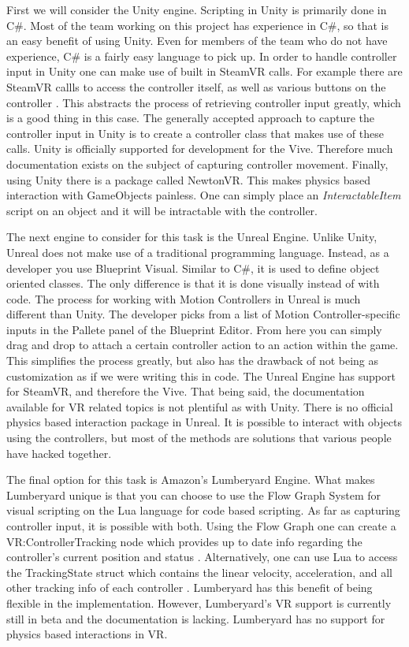 \documentclass[10pt,journal,compsoc,onecolumn, draftclsnofoot]{IEEEtran}
\begin{document}
First we will consider the Unity engine. Scripting in Unity is primarily done in C\#.
Most of the team working on this project has experience in C\#, so that is an easy benefit of using Unity.
Even for members of the team who do not have experience, C\# is a fairly easy language to pick up.
In order to handle controller input in Unity one can make use of built in SteamVR calls.
For example there are SteamVR callls to access the controller itself, as well as various buttons on the controller \cite{steamvr_controllers}.
This abstracts the process of retrieving controller input greatly, which is a good thing in this case.
The generally accepted approach to capture the controller input in Unity is to create a controller class that makes use of these calls.
Unity is officially supported for development for the Vive.
Therefore much documentation exists on the subject of capturing controller movement.
Finally, using Unity there is a package called NewtonVR.
This makes physics based interaction with GameObjects painless.
One can simply place an \textit{InteractableItem} script on an object and it will be intractable with the controller.

The next engine to consider for this task is the Unreal Engine.
Unlike Unity, Unreal does not make use of a traditional programming language.
Instead, as a developer you use Blueprint Visual.
Similar to C\#, it is used to define object oriented classes.
The only difference is that it is done visually instead of with code.
The process for working with Motion Controllers in Unreal is much different than Unity.
The developer picks from a list of Motion Controller-specific inputs in the Pallete panel of the Blueprint Editor\cite{unreal_controller}.
From here you can simply drag and drop to attach a certain controller action to an action within the game.
This simplifies the process greatly, but also has the drawback of not being as customization as if we were writing this in code.
The Unreal Engine has support for SteamVR, and therefore the Vive.
That being said, the documentation available for VR related topics is not plentiful as with Unity.
There is no official physics based interaction package in Unreal.
It is possible to interact with objects using the controllers, but most of the methods are solutions that various people have hacked together.

The final option for this task is Amazon's Lumberyard Engine.
What makes Lumberyard unique is that you can choose to use the Flow Graph System for visual scripting on the Lua language for code based scripting.
As far as capturing controller input, it is possible with both.
Using the Flow Graph one can create a VR:ControllerTracking node which provides up to date info regarding the controller's current position and status \cite{lumberyard_controller_flow}.
Alternatively, one can use Lua to access the TrackingState struct which contains the linear velocity, acceleration, and all other tracking info of each controller \cite{lumberyard_controller_lua}.
Lumberyard has this benefit of being flexible in the implementation.
However, Lumberyard's VR support is currently still in beta and the documentation is lacking.
Lumberyard has no support for physics based interactions in VR.
\end{document}
